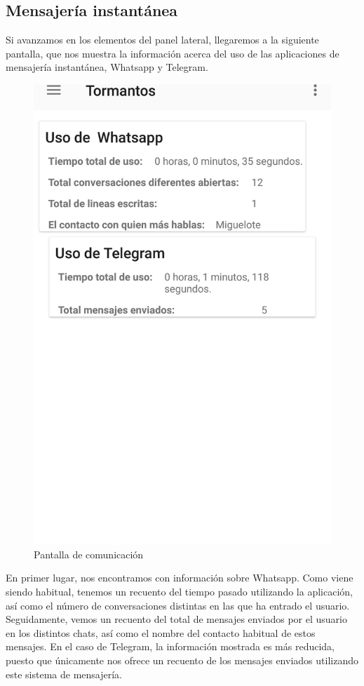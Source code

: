 \documentclass[12pt,a4paper,oneside]{book} %
\begin{document}
\subsection{Mensajería instantánea}
Si avanzamos en los elementos del panel lateral, llegaremos a la siguiente pantalla, que nos muestra la información acerca del uso de las aplicaciones de mensajería instantánea, Whatsapp y Telegram. 
\begin{figure}[H]
	\begin{center}
     	\includegraphics[scale=0.2]{pictures/capsapp/messaging.png}
	    	\caption{Pantalla de comunicación}
    	\label{fig:Pantalla de comunicacion}
	\end{center}
\end{figure}
En primer lugar, nos encontramos con información sobre Whatsapp. Como viene siendo habitual, tenemos un recuento del tiempo pasado utilizando la aplicación, así como el número de conversaciones distintas en las que ha entrado el usuario. 
\newline \newline 
Seguidamente, vemos un recuento del total de mensajes enviados por el usuario en los distintos chats, así como el nombre del contacto habitual de estos mensajes. 
\newline \newline 
En el caso de Telegram, la información mostrada es más reducida, puesto que únicamente nos ofrece un recuento de los mensajes enviados utilizando este sistema de mensajería. 
\end{document}
